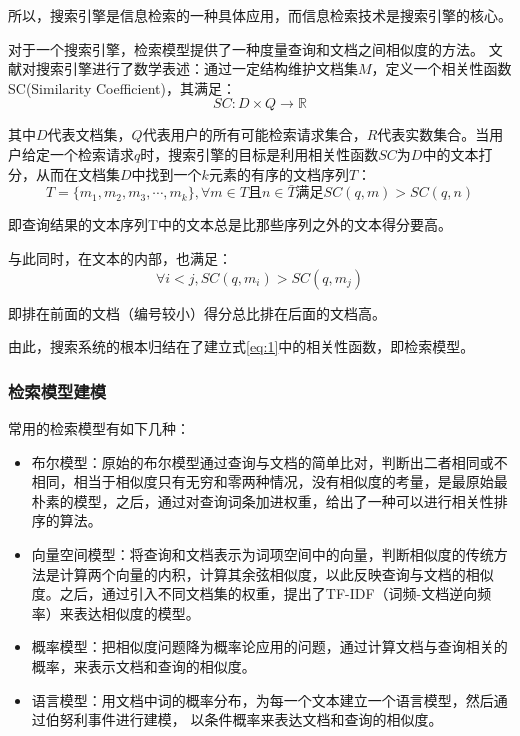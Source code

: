 \documentclass[12pt,a4paper]{article}
\begin{document}
	所以，搜索引擎是信息检索的一种具体应用，而信息检索技术是搜索引擎的核心。

	对于一个搜索引擎，检索模型提供了一种度量查询和文档之间相似度的方法。\nocite{24} 文献\cite{25}对搜索引擎进行了数学表述：通过一定结构维护文档集$M$，定义一个相关性函数{\Times SC(Similarity Coefficient)}，其满足：
	\begin{equation}\label{eq:1}
	 SC: D \times Q \longrightarrow \mathbb{R}
	\end{equation}
	
	其中$D$代表文档集，$Q$代表用户的所有可能检索请求集合，$R$代表实数集合。当用户给定一个检索请求$q$时，搜索引擎的目标是利用相关性函数$SC$为$D$中的文本打分，从而在文档集$D$中找到一个$k$元素的有序的文档序列$T$：
	\begin{equation}
	T=\{ m_{1},m_{2},m_{3},\cdots, m_{k} \},\forall m \in T 且 n \in \bar{T} 满足 SC(q,m)>SC(q,n)
	\end{equation}
	
	即查询结果的文本序列T中的文本总是比那些序列之外的文本得分要高。
	
	与此同时，在文本的内部，也满足：
	\begin{equation}
	\forall i < j, SC(q,m_{i})>SC(q,m_{j})
	\end{equation}
	
	即排在前面的文档（编号较小）得分总比排在后面的文档高。
	
	由此，搜索系统的根本归结在了建立式\ref{eq:1}中的相关性函数，即检索模型。
		\subsubsection{检索模型建模}
	常用的检索模型有如下几种：
	\begin{itemize}
		\item
	布尔模型：原始的布尔模型通过查询与文档的简单比对，判断出二者相同或不相同，相当于相似度只有无穷和零两种情况，没有相似度的考量，是最原始最朴素的模型，之后，通过对查询词条加进权重，给出了一种可以进行相关性排序的算法\cite{salton1970}。
		\item
	向量空间模型：将查询和文档表示为词项空间中的向量，判断相似度的传统方法是计算两个向量的内积，计算其余弦相似度，以此反映查询与文档的相似度。\cite{salton1975}之后，通过引入不同文档集的权重，提出了{\Times TF-IDF}（词频-文档逆向频率）\cite{robertson1976}来表达相似度的模型。
		\item
	概率模型：把相似度问题降为概率论应用的问题，通过计算文档与查询相关的概率，来表示文档和查询的相似度。
		\item
	语言模型：用文档中词的概率分布，为每一个文本建立一个语言模型，然后通过伯努利事件进行建模， 以条件概率来表达文档和查询的相似度\cite{ponte1998}。
	\end{itemize}
	
\end{document}

